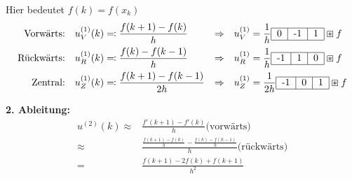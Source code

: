 \documentclass{article}
\theoremstyle{plain}
\theoremstyle{definition}
\numberwithin{equation}{section}
\begin{document}
    \begin{minipage}[c]{0.79\linewidth}
        Hier bedeutet $f(k) = f(x_k)$\\
        \begin{align*}
            \text{Vorwärts:}& &u_V^{(1)}(k) & \eqqcolon \frac{f(k+1) - f(k)}{h} & \Rightarrow& &u_V^{(1)} &= \frac{1}{h}\begin{tabular}{|c|c|c|}
                \hline
                0 & -1 & 1\\
                \hline
            \end{tabular} \boxast f\\
            \text{Rückwärts:}& &u_R^{(1)}(k) & \eqqcolon \frac{f(k) - f(k-1)}{h} & \Rightarrow& &u_R^{(1)} &= \frac{1}{h}\begin{tabular}{|c|c|c|}
                \hline
                -1 & 1 & 0\\
                \hline
            \end{tabular} \boxast f\\
            \text{Zentral:}& &u_Z^{(1)}(k) & \eqqcolon \frac{f(k+1) - f(k-1)}{2h} & \Rightarrow& &u_Z^{(1)} &= \frac{1}{2h}\begin{tabular}{|c|c|c|}
                \hline
                -1 & 0 & 1\\
                \hline
                \end{tabular} \boxast f
        \end{align*}
    \end{minipage}

    \hfill

    \textbf{\large{2. Ableitung:}}
    \begin{align*}
        u^{(2)}(k) \approx & \frac{f'(k+1) - f'(k)}{h} \text{(vorwärts)}\\
        \approx & \frac{\frac{f(k+1) - f(k)}{h} - \frac{f(k) - f(k-1)}{h}}{h} \text{(rückwärts)} \\
        = & \frac{f(k+1) -2 f(k) + f(k+1)}{h^2}
    \end{align*}
\end{document}
